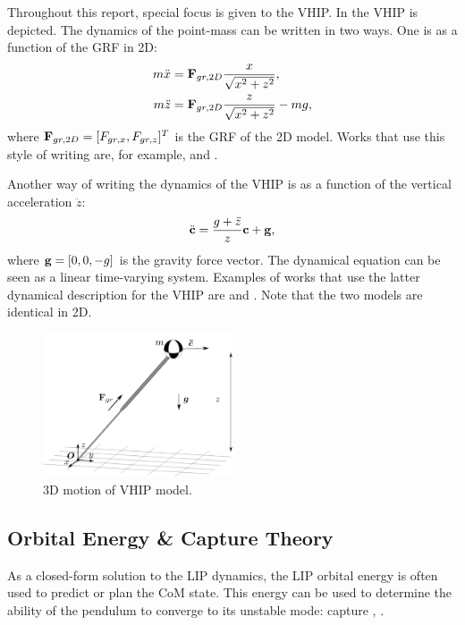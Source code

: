Throughout this report, special focus is given to the \ac{VHIP}. In  the \ac{VHIP} is depicted. The dynamics of the point-mass can be written in two ways. One is as a function of the \ac{GRF} in \ac{2D}:
\begin{align}
	m\ddot{x} &= \mathbf{F}_{gr,2D}\frac{x}{\sqrt{x^2 + z^2}},\\
	m\ddot{z} &= \mathbf{F}_{gr,2D}\frac{z}{\sqrt{x^2 + z^2}} - mg,
	\label{eq:dynamicsprattstyle}
\end{align}
where $\mathbf{F}_{gr,2D}=[F_{gr,x}, F_{gr,z}]^T$ is the \ac{GRF} of the \ac{2D}  model. Works that use this style of writing are, for example, \cite{pratt2007derivation} and \cite{koolen2016balance}.

Another way of writing the dynamics of the \ac{VHIP} is as a function of the vertical acceleration $\ddot{z}$:
\begin{equation}
	\ddot{\mathbf{c}} = \frac{g+\ddot{z}}{z}\mathbf{c} + \mathbf{g},
	\label{eq:dynamicscaronstyle}
\end{equation}
where $\mathbf{g}=[0,0,-g]$ is the gravity force vector. The dynamical equation can be seen as a linear time-varying system. Examples of works that use the latter dynamical description for the \ac{VHIP} are \cite{hopkins2014humanoid} and \cite{caron2018balance}. Note that the two models are identical in \ac{2D}.
\begin{figure}
\centering
\includegraphics[width=0.5\textwidth]{STYLESTUFF/3DCoMwithoutfootVHIP.png}
\caption{\ac{3D} motion of \ac{VHIP} model.}
\label{fig:3dvhip}
\end{figure}

\subsection{Orbital Energy \& Capture Theory}\label{sec:ewalking}
As a closed-form solution to the \ac{LIP} dynamics, the \ac{LIP} orbital energy is often used to predict or plan the \ac{CoM} state. This energy can be used to determine the ability of the pendulum to converge to its unstable mode: capture \cite{pratt2006capture}, \cite{koolen2012capturability}.

